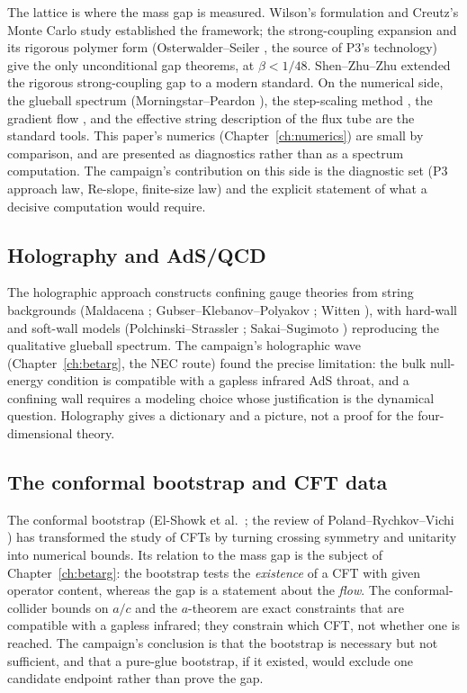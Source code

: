 The lattice is where the mass gap is measured. Wilson's formulation \cite{wilson} and Creutz's
Monte Carlo study \cite{creutz} established the framework; the strong-coupling expansion and its
rigorous polymer form (Osterwalder--Seiler \cite{osterwalder-seiler}, the source of P3's
technology) give the only unconditional gap theorems, at $\beta<1/48$. Shen--Zhu--Zhu
\cite{szz} extended the rigorous strong-coupling gap to a modern standard. On the numerical side,
the glueball spectrum (Morningstar--Peardon \cite{morningstar}), the step-scaling method
\cite{luscher-stepscaling}, the gradient flow \cite{luscher-flow}, and the effective string
description of the flux tube \cite{luscher-weisz, polchinski-strominger} are the standard tools.
This paper's numerics (Chapter~\ref{ch:numerics}) are small by comparison, and are presented as
diagnostics rather than as a spectrum computation. The campaign's contribution on this side is
the diagnostic set (P3 approach law, Re-slope, finite-size law) and the explicit statement of
what a decisive computation would require.

\subsection{Holography and AdS/QCD}

The holographic approach constructs confining gauge theories from string backgrounds
(Maldacena \cite{maldacena}; Gubser--Klebanov--Polyakov \cite{gkp}; Witten \cite{witten,
witten-thermal}), with hard-wall and soft-wall models (Polchinski--Strassler \cite{polchinski-strassler};
Sakai--Sugimoto \cite{sakai-sugimoto}) reproducing the qualitative glueball spectrum. The
campaign's holographic wave (Chapter~\ref{ch:betarg}, the NEC route) found the precise limitation:
the bulk null-energy condition is compatible with a gapless infrared AdS throat, and a confining
wall requires a modeling choice whose justification is the dynamical question. Holography gives
a dictionary and a picture, not a proof for the four-dimensional theory.

\subsection{The conformal bootstrap and CFT data}

The conformal bootstrap (El-Showk et al.\ \cite{elshowk}; the review of Poland--Rychkov--Vichi
\cite{prv}) has transformed the study of CFTs by turning crossing symmetry and unitarity into
numerical bounds. Its relation to the mass gap is the subject of Chapter~\ref{ch:betarg}: the
bootstrap tests the \emph{existence} of a CFT with given operator content, whereas the gap is a
statement about the \emph{flow}. The conformal-collider bounds on $a/c$
\cite{hofman-maldacena, hofman-li} and the $a$-theorem \cite{komargodski-schwimmer} are exact constraints that are
compatible with a gapless infrared; they constrain which CFT, not whether one is reached. The
campaign's conclusion is that the bootstrap is necessary but not sufficient, and that a pure-glue
bootstrap, if it existed, would exclude one candidate endpoint rather than prove the gap.

